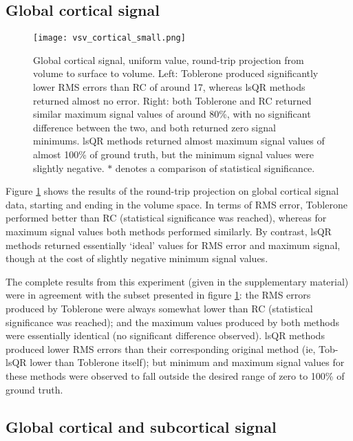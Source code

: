 \documentclass[review]{elsarticle}
\begin{document}
\subsection{Global cortical signal}

\begin{figure}[H]
\centering
\texttt{[image: vsv\_cortical\_small.png]}
\caption{Global cortical signal, uniform value, round-trip projection from volume to surface to volume. Left: Toblerone produced significantly lower RMS errors than RC of around 17, whereas lsQR methods returned almost no error. Right: both Toblerone and RC returned similar maximum signal values of around 80\%, with no significant difference between the two, and both returned zero signal minimums. lsQR methods returned almost maximum signal values of almost 100\% of ground truth, but the minimum signal values were slightly negative. $*$ denotes a comparison of statistical significance.}
\label{vsv_cortical_small}
\end{figure}

Figure \ref{vsv_cortical_small} shows the results of the round-trip projection on global cortical signal data, starting and ending in the volume space. In terms of RMS error, Toblerone performed better than RC (statistical significance was reached), whereas for maximum signal values both methods performed similarly. By contrast, lsQR methods returned essentially `ideal' values for RMS error and maximum signal, though at the cost of slightly negative minimum signal values. 

The complete results from this experiment (given in the supplementary material) were in agreement with the subset presented in figure \ref{vsv_cortical_small}: the RMS errors produced by Toblerone were always somewhat lower than RC (statistical significance was reached); and the maximum values produced by both methods were essentially identical (no significant difference observed). lsQR methods produced lower RMS errors than their corresponding original method (ie, Tob-lsQR lower than Toblerone itself); but minimum and maximum signal values for these methods were observed to fall outside the desired range of zero to 100\% of ground truth. 


\subsection{Global cortical and subcortical signal}
\end{document}
